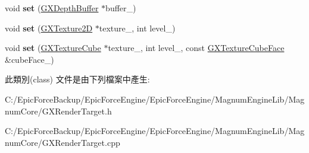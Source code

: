 \begin{DoxyCompactItemize}
\item 
void {\bfseries set} (\hyperlink{class_magnum_1_1_g_x_depth_buffer}{G\+X\+Depth\+Buffer} $\ast$buffer\+\_\+)\hypertarget{class_magnum_1_1_g_x_render_target_aafa4394a8e6cd0544eae0059f3243c06}{}\label{class_magnum_1_1_g_x_render_target_aafa4394a8e6cd0544eae0059f3243c06}

\item 
void {\bfseries set} (\hyperlink{class_magnum_1_1_g_x_texture2_d}{G\+X\+Texture2D} $\ast$texture\+\_\+, int level\+\_\+)\hypertarget{class_magnum_1_1_g_x_render_target_a4152b10777bc5a4ff2218fae26f81047}{}\label{class_magnum_1_1_g_x_render_target_a4152b10777bc5a4ff2218fae26f81047}

\item 
void {\bfseries set} (\hyperlink{class_magnum_1_1_g_x_texture_cube}{G\+X\+Texture\+Cube} $\ast$texture\+\_\+, int level\+\_\+, const \hyperlink{class_magnum_1_1_g_x_texture_cube_face}{G\+X\+Texture\+Cube\+Face} \&cube\+Face\+\_\+)\hypertarget{class_magnum_1_1_g_x_render_target_a8df73a108d64222336114a037a9beb08}{}\label{class_magnum_1_1_g_x_render_target_a8df73a108d64222336114a037a9beb08}

\end{DoxyCompactItemize}


此類別(class) 文件是由下列檔案中產生\+:\begin{DoxyCompactItemize}
\item 
C\+:/\+Epic\+Force\+Backup/\+Epic\+Force\+Engine/\+Epic\+Force\+Engine/\+Magnum\+Engine\+Lib/\+Magnum\+Core/G\+X\+Render\+Target.\+h\item 
C\+:/\+Epic\+Force\+Backup/\+Epic\+Force\+Engine/\+Epic\+Force\+Engine/\+Magnum\+Engine\+Lib/\+Magnum\+Core/G\+X\+Render\+Target.\+cpp\end{DoxyCompactItemize}
